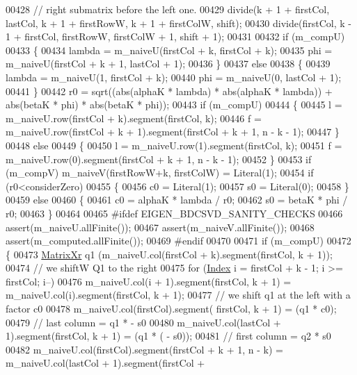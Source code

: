 \begin{DoxyCode}
00428   \textcolor{comment}{// right submatrix before the left one. }
00429   divide(k + 1 + firstCol, lastCol, k + 1 + firstRowW, k + 1 + firstColW, shift);
00430   divide(firstCol, k - 1 + firstCol, firstRowW, firstColW + 1, shift + 1);
00431 
00432   \textcolor{keywordflow}{if} (m\_compU)
00433   \{
00434     lambda = m\_naiveU(firstCol + k, firstCol + k);
00435     phi = m\_naiveU(firstCol + k + 1, lastCol + 1);
00436   \} 
00437   \textcolor{keywordflow}{else} 
00438   \{
00439     lambda = m\_naiveU(1, firstCol + k);
00440     phi = m\_naiveU(0, lastCol + 1);
00441   \}
00442   r0 = sqrt((abs(alphaK * lambda) * abs(alphaK * lambda)) + abs(betaK * phi) * abs(betaK * phi));
00443   \textcolor{keywordflow}{if} (m\_compU)
00444   \{
00445     l = m\_naiveU.row(firstCol + k).segment(firstCol, k);
00446     f = m\_naiveU.row(firstCol + k + 1).segment(firstCol + k + 1, n - k - 1);
00447   \} 
00448   \textcolor{keywordflow}{else} 
00449   \{
00450     l = m\_naiveU.row(1).segment(firstCol, k);
00451     f = m\_naiveU.row(0).segment(firstCol + k + 1, n - k - 1);
00452   \}
00453   \textcolor{keywordflow}{if} (m\_compV) m\_naiveV(firstRowW+k, firstColW) = Literal(1);
00454   \textcolor{keywordflow}{if} (r0<considerZero)
00455   \{
00456     c0 = Literal(1);
00457     s0 = Literal(0);
00458   \}
00459   \textcolor{keywordflow}{else}
00460   \{
00461     c0 = alphaK * lambda / r0;
00462     s0 = betaK * phi / r0;
00463   \}
00464   
00465 \textcolor{preprocessor}{#ifdef EIGEN\_BDCSVD\_SANITY\_CHECKS}
00466   assert(m\_naiveU.allFinite());
00467   assert(m\_naiveV.allFinite());
00468   assert(m\_computed.allFinite());
00469 \textcolor{preprocessor}{#endif}
00470   
00471   \textcolor{keywordflow}{if} (m\_compU)
00472   \{
00473     \hyperlink{group___core___module}{MatrixXr} q1 (m\_naiveU.col(firstCol + k).segment(firstCol, k + 1));     
00474     \textcolor{comment}{// we shiftW Q1 to the right}
00475     \textcolor{keywordflow}{for} (\hyperlink{namespace_eigen_a62e77e0933482dafde8fe197d9a2cfde}{Index} i = firstCol + k - 1; i >= firstCol; i--) 
00476       m\_naiveU.col(i + 1).segment(firstCol, k + 1) = m\_naiveU.col(i).segment(firstCol, k + 1);
00477     \textcolor{comment}{// we shift q1 at the left with a factor c0}
00478     m\_naiveU.col(firstCol).segment( firstCol, k + 1) = (q1 * c0);
00479     \textcolor{comment}{// last column = q1 * - s0}
00480     m\_naiveU.col(lastCol + 1).segment(firstCol, k + 1) = (q1 * ( - s0));
00481     \textcolor{comment}{// first column = q2 * s0}
00482     m\_naiveU.col(firstCol).segment(firstCol + k + 1, n - k) = m\_naiveU.col(lastCol + 1).segment(firstCol + 

\end{DoxyCode}
